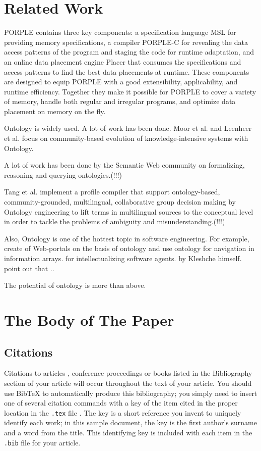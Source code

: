 \documentclass{sig-alternate}
\begin{document}
{\section{Related Work}
PORPLE contains three key components: a specification language MSL for providing memory specifications, a compiler PORPLE-C for revealing the data access patterns of the program and staging the code for runtime adaptation, and an online data placement engine Placer that consumes the specifications and access patterns to find the best data placements at runtime. These components are designed to equip PORPLE with a good extensibility, applicability, and runtime efficiency. Together they make it possible for PORPLE to cover a variety of memory, handle both regular and irregular programs, and optimize data placement on memory on the fly.

Ontology is widely used. A lot of work has been done. Moor et al. \cite{ontology3} and Leenheer et al. \cite{ontology4} focus on community-based evolution of knowledge-intensive systems with Ontology.

A lot of work has been done by the Semantic Web community on formalizing, reasoning and querying ontologies.(!!!)

Tang et al. \cite{ontology5} implement a profile compiler that support ontology-based, community-grounded, multilingual, collaborative group decision making by Ontology engineering to lift terms in multilingual sources to the conceptual level in order to tackle the problems of ambiguity and misunderstanding.(!!!)

Also, Ontology is one of the hottest topic in software engineering. For example, create of Web-portals on the basis of ontology and use ontology for navigation in information arrays. for intellectualizing software agents. \cite{ontology6} by Kleshche himself. point out that ..

The potential of ontology is more than above.
\section{The {\secit Body} of The Paper}

\subsection{Citations}
Citations to articles \cite{bowman:reasoning,
clark:pct, braams:babel, herlihy:methodology},
conference proceedings \cite{clark:pct} or
books \cite{salas:calculus, Lamport:LaTeX} listed
in the Bibliography section of your
article will occur throughout the text of your article.
You should use BibTeX to automatically produce this bibliography;
you simply need to insert one of several citation commands with
a key of the item cited in the proper location in
the \texttt{.tex} file \cite{Lamport:LaTeX}.
The key is a short reference you invent to uniquely
identify each work; in this sample document, the key is
the first author's surname and a
word from the title.  This identifying key is included
with each item in the \texttt{.bib} file for your article.

}
\end{document}
